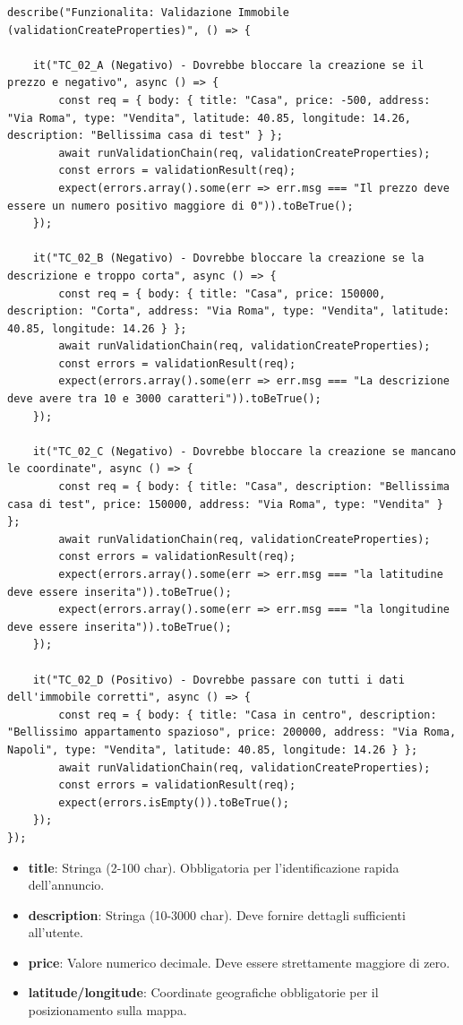 \documentclass{article}
\begin{document}
\begin{lstlisting}[caption=Unit Test della validazione immobili (validationCreateProperties)]
describe("Funzionalita: Validazione Immobile (validationCreateProperties)", () => {

    it("TC_02_A (Negativo) - Dovrebbe bloccare la creazione se il prezzo e negativo", async () => {
        const req = { body: { title: "Casa", price: -500, address: "Via Roma", type: "Vendita", latitude: 40.85, longitude: 14.26, description: "Bellissima casa di test" } };
        await runValidationChain(req, validationCreateProperties);
        const errors = validationResult(req);
        expect(errors.array().some(err => err.msg === "Il prezzo deve essere un numero positivo maggiore di 0")).toBeTrue();
    });

    it("TC_02_B (Negativo) - Dovrebbe bloccare la creazione se la descrizione e troppo corta", async () => {
        const req = { body: { title: "Casa", price: 150000, description: "Corta", address: "Via Roma", type: "Vendita", latitude: 40.85, longitude: 14.26 } };
        await runValidationChain(req, validationCreateProperties);
        const errors = validationResult(req);
        expect(errors.array().some(err => err.msg === "La descrizione deve avere tra 10 e 3000 caratteri")).toBeTrue();
    });

    it("TC_02_C (Negativo) - Dovrebbe bloccare la creazione se mancano le coordinate", async () => {
        const req = { body: { title: "Casa", description: "Bellissima casa di test", price: 150000, address: "Via Roma", type: "Vendita" } };
        await runValidationChain(req, validationCreateProperties);
        const errors = validationResult(req);
        expect(errors.array().some(err => err.msg === "la latitudine deve essere inserita")).toBeTrue();
        expect(errors.array().some(err => err.msg === "la longitudine deve essere inserita")).toBeTrue();
    });

    it("TC_02_D (Positivo) - Dovrebbe passare con tutti i dati dell'immobile corretti", async () => {
        const req = { body: { title: "Casa in centro", description: "Bellissimo appartamento spazioso", price: 200000, address: "Via Roma, Napoli", type: "Vendita", latitude: 40.85, longitude: 14.26 } };
        await runValidationChain(req, validationCreateProperties);
        const errors = validationResult(req);
        expect(errors.isEmpty()).toBeTrue();
    });
});
\end{lstlisting}

\begin{itemize}
    \item \textbf{title}: Stringa (2-100 char). Obbligatoria per l'identificazione rapida dell'annuncio.
    \item \textbf{description}: Stringa (10-3000 char). Deve fornire dettagli sufficienti all'utente.
    \item \textbf{price}: Valore numerico decimale. Deve essere strettamente maggiore di zero.
    \item \textbf{latitude/longitude}: Coordinate geografiche obbligatorie per il posizionamento sulla mappa.
\end{itemize}
\end{document}
